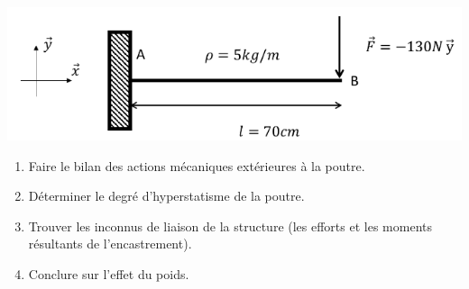 \documentclass[lecture.tex]{subfiles}
\begin{document}
\exercice{}

\begin{center}
  \includegraphics[scale=0.4]{exo-poutre2d.png}
\end{center}

\begin{enumerate}
  \item Faire le bilan des actions mécaniques extérieures à la poutre.
  \item Déterminer le degré d’hyperstatisme de la poutre.
  \item Trouver les inconnus de liaison de la structure (les efforts et les moments résultants de l’encastrement).
  \item Conclure sur l’effet du poids.
\end{enumerate}

\finexercice
\end{document}
